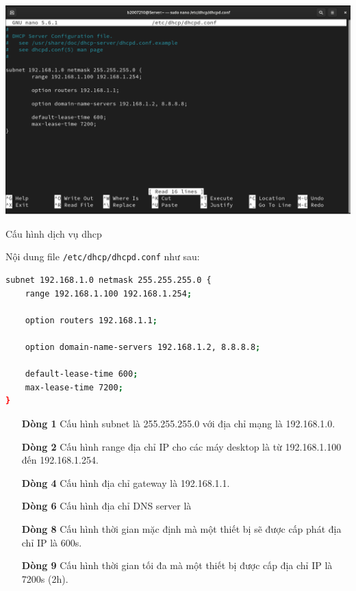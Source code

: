 \documentclass[a4paper, 11pt]{article}
\begin{document}
\begin{enumerate}
\begin{minipage}
              \captionsetup{type=figure}
              \centering
              \includegraphics[width=\linewidth]{images/dhcpd-conf.png}
              \caption{Cấu hình dịch vụ dhcp}
              \label{figure:dhcpd-conf}
          \end{minipage}
          Nội dung file \texttt{/etc/dhcp/dhcpd.conf} như sau:
          \begin{lstlisting}[language=bash, caption=Nội dung file \texttt{/etc/dhcp/dhcpd.conf}]
subnet 192.168.1.0 netmask 255.255.255.0 {
    range 192.168.1.100 192.168.1.254;

    option routers 192.168.1.1;

    option domain-name-servers 192.168.1.2, 8.8.8.8;
    
    default-lease-time 600;
    max-lease-time 7200;
}
\end{lstlisting}
          \begin{itemize}
              \item [\textbf{Dòng 1}] Cấu hình subnet là 255.255.255.0 với địa chỉ mạng là 192.168.1.0.
              \item [\textbf{Dòng 2}] Cấu hình range địa chỉ IP cho các máy desktop là từ 192.168.1.100 đến 192.168.1.254.
              \item [\textbf{Dòng 4}] Cấu hình địa chỉ gateway là 192.168.1.1.
              \item [\textbf{Dòng 6}] Cấu hình địa chỉ DNS server là
              \item [\textbf{Dòng 8}] Cấu hình thời gian mặc định mà một thiết bị sẽ được cấp phát địa chỉ IP là 600s.
              \item [\textbf{Dòng 9}] Cấu hình thời gian tối đa mà một thiết bị được cấp địa chỉ IP là 7200s (2h).
          \end{itemize}


\end{enumerate}
\end{document}
